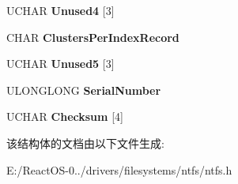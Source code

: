 \begin{DoxyCompactItemize}
\mbox{\label{struct___e_x_t_e_n_d_e_d___b_i_o_s___p_a_r_a_m_e_t_e_r_s___b_l_o_c_k_a6f9a4f0f626fc93f1594f5bb292eb665}} 
U\+C\+H\+AR {\bfseries Unused4} \mbox{[}3\mbox{]}
\item 
\mbox{\label{struct___e_x_t_e_n_d_e_d___b_i_o_s___p_a_r_a_m_e_t_e_r_s___b_l_o_c_k_a9311c2c61208a429aaee9532adb44f95}} 
C\+H\+AR {\bfseries Clusters\+Per\+Index\+Record}
\item 
\mbox{\label{struct___e_x_t_e_n_d_e_d___b_i_o_s___p_a_r_a_m_e_t_e_r_s___b_l_o_c_k_a9a511dae90fad6344e185d4bb41886fb}} 
U\+C\+H\+AR {\bfseries Unused5} \mbox{[}3\mbox{]}
\item 
\mbox{\label{struct___e_x_t_e_n_d_e_d___b_i_o_s___p_a_r_a_m_e_t_e_r_s___b_l_o_c_k_a520b349cb3b76b7566cf5ebe917ca71d}} 
U\+L\+O\+N\+G\+L\+O\+NG {\bfseries Serial\+Number}
\item 
\mbox{\label{struct___e_x_t_e_n_d_e_d___b_i_o_s___p_a_r_a_m_e_t_e_r_s___b_l_o_c_k_a904f865f34caf7121acefed2cac77144}} 
U\+C\+H\+AR {\bfseries Checksum} \mbox{[}4\mbox{]}
\end{DoxyCompactItemize}


该结构体的文档由以下文件生成\+:\begin{DoxyCompactItemize}
\item 
E\+:/\+React\+O\+S-\/0../drivers/filesystems/ntfs/ntfs.\+h\end{DoxyCompactItemize}
